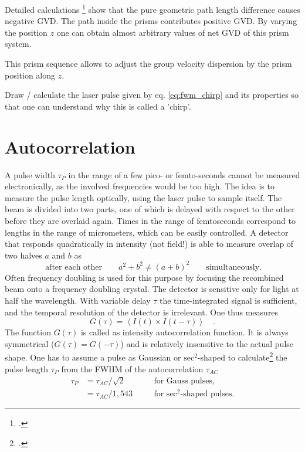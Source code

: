  Detailed calculations \footcite{DielsRudolph1996}
show that the pure geometric path length difference causes 
negative GVD. The path inside the prisms contributes  positive GVD.  By varying the position $z$ one can obtain almost arbitrary values of net GVD of this prism system.


\begin{marginfigure}
\caption{This prism sequence allows to adjust the group velocity dispersion by the prism position along $z$. }
\label{fig:fwm_prism}
\end{marginfigure}


\begin{questions}
\item Draw / calculate the laser pulse  given by eq. \ref{eq:fwm_chirp} and its properties so that one can understand why this is called a 'chirp'.
\end{questions}



\section{Autocorrelation}

A pulse width $\tau_P$ in the range of a few pico- or femto-seconds cannot be measured electronically, as the involved frequencies  would be too high. The idea is to measure the pulse length optically, using the  laser pulse to sample itself. The beam is divided into two parts, one of which is delayed with respect to the other before they are overlaid again.
 Times in the 
range of femtoseconds correspond to lengths in the range of
micrometers, which can be easily controlled. A detector that responds quadratically in intensity (not field!) is able to measure  overlap of two halves $a$ and $b$ as
\begin{equation}
 \ \text{after each other} \qquad a^2 + b^2 \neq (a+b)^2 \qquad
 \text{simultaneously.}
\end{equation}
Often  frequency doubling is used for this purpose by focusing the
recombined beam onto a frequency doubling crystal.
The detector is sensitive only for light at half the wavelength. With variable delay $\tau$ the time-integrated signal is sufficient, and  the temporal resolution
of the detector is  irrelevant. One thus measures
\begin{equation}
  G(\tau) = \left< I(t) \times I(t-\tau) \right> \quad.
\end{equation}
The function $G(\tau)$ is called as intensity autocorrelation function. It is always symmetrical ($G(\tau) = G(-\tau)$) and
is relatively insensitive to the actual pulse shape.  One has to assume a pulse as Gaussian
 or
$\text{sec}^2$-shaped to calculate\footcite{DielsRudolph1996} the pulse length $\tau_{P} $ from the 
FWHM of the autocorrelation
$\tau_{AC}$ 
\begin{align}
  \tau_{P} &= \tau_{AC} / \sqrt{2} &\quad& \text{for Gauss pulses,} \\
           &= \tau_{AC} / 1,543 && \text{for $\text{sec}^2$-shaped pulses.}
\end{align}


